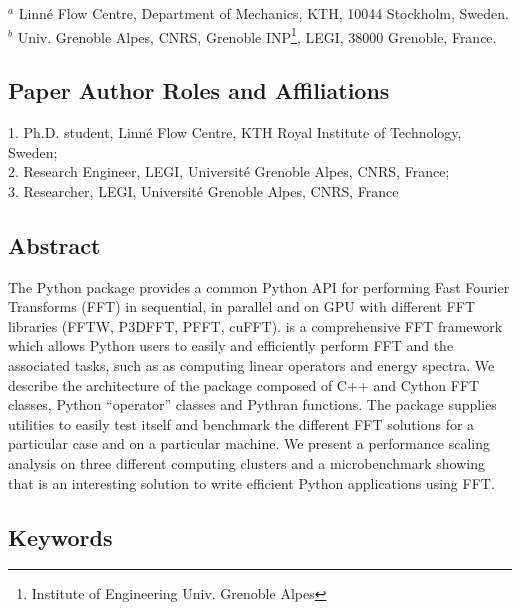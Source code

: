 $^a$ Linn\'e Flow Centre, Department of Mechanics, KTH, 10044 Stockholm, Sweden.
$^b$ Univ. Grenoble Alpes, CNRS, Grenoble INP\footnote{Institute of Engineering
Univ. Grenoble Alpes}, LEGI, 38000 Grenoble, France.\\

\subsection{Paper Author Roles and Affiliations}

1. Ph.D. student, Linn\'e Flow Centre, KTH Royal Institute of Technology,
Sweden; \\
2. Research Engineer, LEGI, Universit\'e Grenoble Alpes, CNRS, France; \\
3. Researcher, LEGI, Universit\'e Grenoble Alpes, CNRS, France

\subsection{Abstract}


The Python package  provides a common Python API for performing
Fast Fourier Transforms (FFT) in sequential, in parallel and on GPU with different
FFT libraries (FFTW, P3DFFT, PFFT, cuFFT).  is a comprehensive FFT
framework which allows Python users to easily and efficiently perform FFT and the
associated tasks, such as as computing linear operators and energy spectra.
%
We describe the architecture of the package composed of C++ and Cython FFT
classes, Python ``operator'' classes and Pythran functions.
%
The package supplies utilities to easily test itself and benchmark the different
FFT solutions for a particular case and on a particular machine.
%
We present a performance scaling analysis on three different computing clusters
and a microbenchmark showing that  is an interesting solution to
write efficient Python applications using FFT.

\subsection{Keywords}

